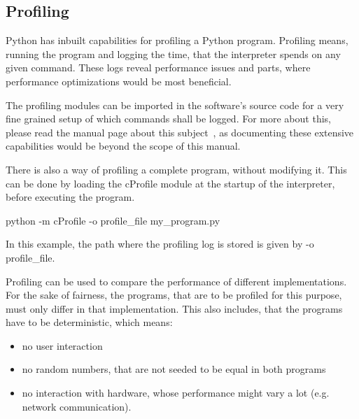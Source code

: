 		\subsection{Profiling}
			Python has inbuilt capabilities for profiling a Python program.
			Profiling means, running the program and logging the time, that the interpreter spends on any given command.
			These logs reveal performance issues and parts, where performance optimizations would be most beneficial.

			The profiling modules can be imported in the software's source code for a very fine grained setup of which commands shall be logged.
			For more about this, please read the manual page about this subject~\cite{Profiling}, as documenting these extensive capabilities would be beyond the scope of this manual.

			There is also a way of profiling a complete program, without modifying it.
			This can be done by loading the {\normalfont \ttfamily cProfile} module at the startup of the interpreter, before executing the program.
			\begin{center}
				{\normalfont \ttfamily python -m cProfile -o profile\_file my\_program.py}
			\end{center}
			In this example, the path where the profiling log is stored is given by {\normalfont \ttfamily -o profile\_file}.

			Profiling can be used to compare the performance of different implementations.
			For the sake of fairness, the programs, that are to be profiled for this purpose, must only differ in that implementation.
			This also includes, that the programs have to be deterministic, which means:
			\begin{itemize}
				\item no user interaction
				\item no random numbers, that are not seeded to be equal in both programs
				\item no interaction with hardware, whose performance might vary a lot (e.g. network communication).
			\end{itemize}

